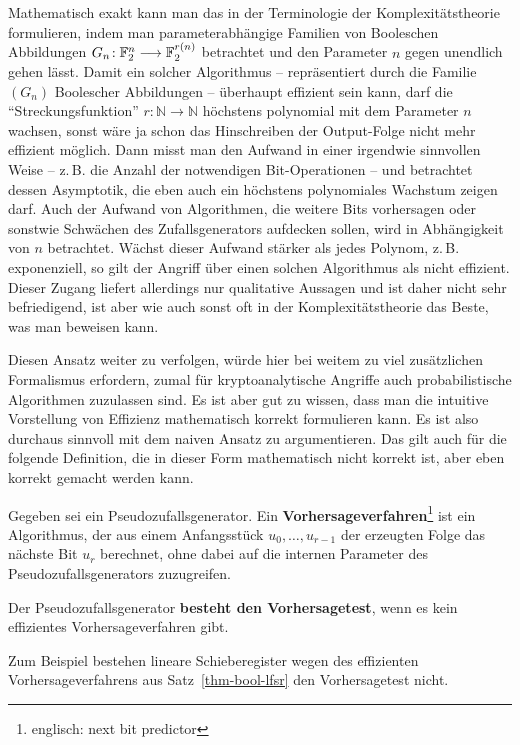 \begin{refsegment}
Mathematisch exakt kann man das in der Terminologie der
Komplexitätstheorie
formulieren, indem man parameterabhängige Familien
von Booleschen Abbildungen
\mbox{$G_n\!: \mathbb{F}_2^n \longrightarrow \mathbb{F}_2^{r(n)}$} betrachtet und den
Parameter $n$ gegen unendlich gehen lässt. Damit ein solcher
Algorithmus -- repräsentiert durch die Familie $(G_n)$ Boolescher
Abbildungen -- überhaupt effizient sein kann, darf die "`Streckungsfunktion"'
$r\!: \mathbb{N} \longrightarrow \mathbb{N}$ höchstens polynomial mit dem Parameter
$n$ wachsen, sonst wäre ja schon das Hinschreiben der Output-Folge
nicht mehr effizient möglich. Dann misst man den
Aufwand in einer irgendwie sinnvollen Weise -- z.\,B. die Anzahl der
notwendigen Bit-Operationen -- und betrachtet dessen Asymptotik,
die eben auch ein höchstens polynomiales Wachstum zeigen darf.
Auch der Aufwand von Algorithmen, die weitere Bits vorhersagen
oder sonstwie Schwächen des Zufallsgenerators aufdecken sollen,
wird in Abhängigkeit von $n$ betrachtet. Wächst dieser Aufwand
stärker als jedes Polynom, z.\,B. exponenziell, so gilt der
Angriff über einen solchen Algorithmus als nicht effizient.
Dieser Zugang liefert allerdings nur qualitative Aussagen und
ist daher nicht sehr befriedigend, ist aber wie auch sonst oft
in der Komplexitätstheorie das Beste, was man beweisen kann.

Diesen Ansatz weiter zu verfolgen, würde hier bei weitem zu viel
zusätzlichen Formalismus erfordern, zumal für kryptoanalytische
Angriffe auch probabilistische Algorithmen zuzulassen sind.
Es ist aber gut zu wissen,
dass man die intuitive Vorstellung von Effizienz mathematisch
korrekt formulieren kann. Es ist also durchaus sinnvoll mit dem
naiven Ansatz zu argumentieren. Das gilt auch für die folgende
Definition, die in dieser Form mathematisch nicht korrekt ist,
aber eben korrekt gemacht werden kann.

\begin{definition}\label{def-bool-prg-pred}
  Gegeben sei ein Pseudozufallsgenerator.
  Ein {\bf  Vorhersageverfahren}\footnote{%
    englisch: next bit predictor
  } ist ein Algorithmus, der aus einem
  Anfangsstück $u_0, \ldots, u_{r-1}$ der erzeugten Folge das nächste
  Bit $u_r$ berechnet, ohne dabei auf die internen Parameter des
  Pseudozufallsgenerators zuzugreifen.

  Der Pseudozufallsgenerator {\bf besteht den
  Vorhersagetest}, wenn
  es kein effizientes Vorhersageverfahren gibt.
\end{definition}
Zum Beispiel bestehen
lineare Schieberegister
wegen des effizienten
Vorhersageverfahrens aus Satz~\ref{thm-bool-lfsr} den Vorhersagetest nicht.


\end{refsegment}
